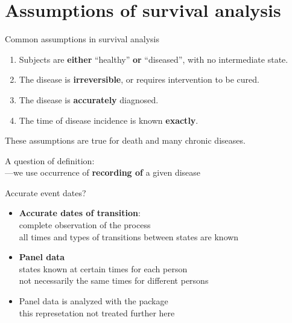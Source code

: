 \section{Assumptions of survival analysis}

\begin{frame}{Common assumptions in survival analysis}
    \begin{enumerate}
    \item Subjects are \textbf{either} ``healthy'' \textbf{or}
      ``diseased'', with no intermediate state.
    \item The disease is \textbf{irreversible}, or requires
      intervention to be cured.
    \item The disease is \textbf{accurately} diagnosed.
    \item The time of disease incidence is known \textbf{exactly}.
    \end{enumerate}
    \pause
    These assumptions are true for \alert{death} and many
    \alert{chronic diseases}.
    \pause

    A question of definition:\\ ---we use occurrence of \textbf{recording of} a
    given disease
\end{frame}

\begin{frame}{Accurate event dates?}
  \begin{itemize}
    \item \textbf{Accurate dates of transition}:\\
      complete observation of the process\\
      all times and types of transitions between states are known
    \item \textbf{Panel data}\\
      states known at certain times for each person\\
      not necessarily the same times for different persons
    \item Panel data is analyzed with the  package\\
      this represetation not treated further here
  \end{itemize}
\end{frame}


